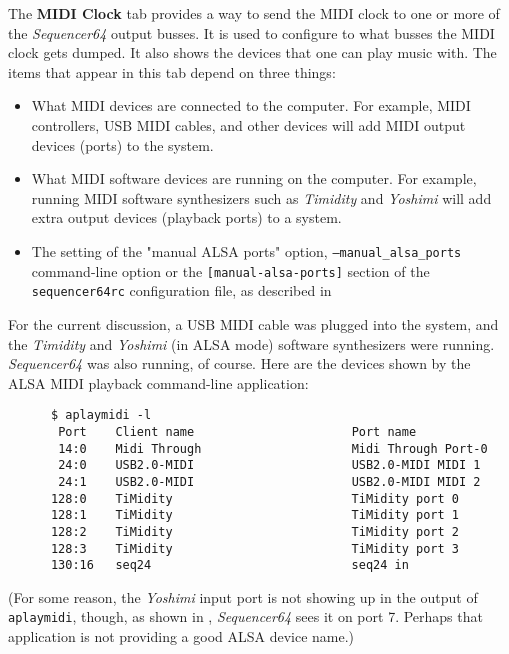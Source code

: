    The \textbf{MIDI Clock} tab provides a way to send the MIDI clock to one
   or more of the \textsl{Sequencer64} output busses.
   It is used to configure to what busses the MIDI clock gets dumped.
   It also shows the devices that one can play music with.
   The items that appear in this tab depend on three things:

   \begin{itemize}
      \item What MIDI devices are connected to the computer.  For example,
         MIDI controllers, USB MIDI cables, and other devices will add MIDI
         output devices (ports) to the system.
      \item What MIDI software devices are running on the computer.
         For example, running MIDI software synthesizers such as
         \textsl{Timidity} and \textsl{Yoshimi} will add extra output devices
         (playback ports) to a system.
      \item The setting of the "manual ALSA ports" option,
         \texttt{--manual\_alsa\_ports} command-line option or the
         \texttt{[manual-alsa-ports]} section of the
         \texttt{sequencer64rc} configuration file, as described in
   \end{itemize}

   For the current discussion, a USB MIDI cable was plugged into the system,
   and the \textsl{Timidity} and \textsl{Yoshimi} (in ALSA mode) software
   synthesizers were running.  \textsl{Sequencer64} was also running, of
   course.  Here are the devices shown by the ALSA MIDI playback
   command-line application:

   \begin{verbatim}
      $ aplaymidi -l
       Port    Client name                      Port name
       14:0    Midi Through                     Midi Through Port-0
       24:0    USB2.0-MIDI                      USB2.0-MIDI MIDI 1
       24:1    USB2.0-MIDI                      USB2.0-MIDI MIDI 2
      128:0    TiMidity                         TiMidity port 0
      128:1    TiMidity                         TiMidity port 1
      128:2    TiMidity                         TiMidity port 2
      128:3    TiMidity                         TiMidity port 3
      130:16   seq24                            seq24 in
   \end{verbatim}

   (For some reason, the \textsl{Yoshimi} input port is not showing up
   in the output of \texttt{aplaymidi}, though, as shown in
   ,
   \textsl{Sequencer64} sees it on port 7.  Perhaps that application is not
   providing a good ALSA device name.)
   
